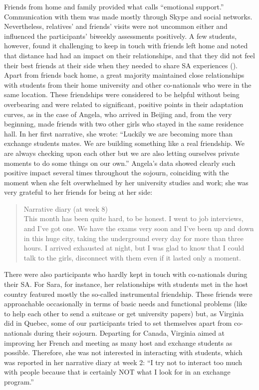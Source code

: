 \documentclass[output=paper]{langsci/langscibook}
\begin{document}
Friends from home and family provided what \citet{Beaven2012} calls “emotional support.” Communication with them was made mostly through Skype and social networks. Nevertheless, relatives’ and friends’ visits were not uncommon either and influenced the participants’ biweekly assessments positively. A few students, however, found it challenging to keep in touch with friends left home and noted that distance had had an impact on their relationships, and that they did not feel their best friends at their side when they needed to share SA experiences (\citealt{ColemanChafer2010}). Apart from friends back home, a great majority maintained close relationships with  students from their home university and other co-nationals who were in the same location. These friendships were considered to be helpful without being overbearing and were related to significant, positive  points in their adaptation curves, as in the case of Angela, who arrived in Beijing and, from the very beginning, made friends with two other  girls who stayed in the same residence hall. In her first narrative, she wrote: “Luckily we are becoming more than exchange students mates. We are building something like a real friendship. We are always checking upon each other but we are also letting ourselves private moments to do some things on our own.” Angela’s data showed clearly such positive impact several times throughout the sojourn, coinciding with the moment when she felt overwhelmed by her university studies and work; she was very grateful to her friends for being at her side:

\begin{quote}
Narrative diary (at week 8)
\smallskip\\
This month has been quite hard, to be honest. I went to job interviews, and I've got one. We have the exams very soon and I've been up and down in this huge city, taking the underground every day for more than three hours. I arrived exhausted at night, but I was glad to know that I could talk to the girls, disconnect with them even if it lasted only a moment.
\end{quote}

There were also participants who hardly kept in touch with co-nationals during their SA. For Sara, for instance, her relationships with  students met in the host country featured mostly the so-called instrumental friendship. These friends were approachable occasionally in terms of basic needs and functional problems (like to help each other to send a suitcase or get university papers) but, as Virginia did in Quebec, some of our participants tried to set themselves apart from co-nationals during their sojourn. Departing for Canada, Virginia aimed at improving her French and meeting as many host and exchange students as possible. Therefore, she was not interested in interacting with  students, which was reported in her narrative diary at week 2: “I try not to interact too much with  people because that is certainly NOT what I look for in an exchange program.” 
\end{document}
